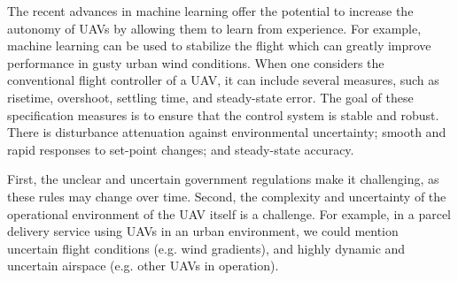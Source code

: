 \documentclass[sigconf]{acmart}
\begin{document}
The recent advances in machine learning offer the potential to increase the autonomy of UAVs by allowing them to learn from experience. For example, machine learning can be used to stabilize the flight which can greatly improve performance in gusty urban wind conditions. 
When one considers the conventional flight controller of a UAV, it can include several measures, such as risetime, overshoot, settling time, and steady-state error.
The goal of these specification measures is to ensure that the control system is stable and robust. 
There is disturbance attenuation against environmental uncertainty; smooth and rapid responses to set-point changes; and steady-state accuracy. 

First, the unclear and uncertain government regulations make it challenging, as these rules may change over time. 
Second, the complexity and uncertainty of the operational environment of the UAV itself is a challenge. 
For example, in a parcel delivery service using UAVs in an urban environment, we could mention uncertain flight conditions (e.g. wind gradients), and highly dynamic and uncertain airspace (e.g. other UAVs in operation). 
\end{document}
